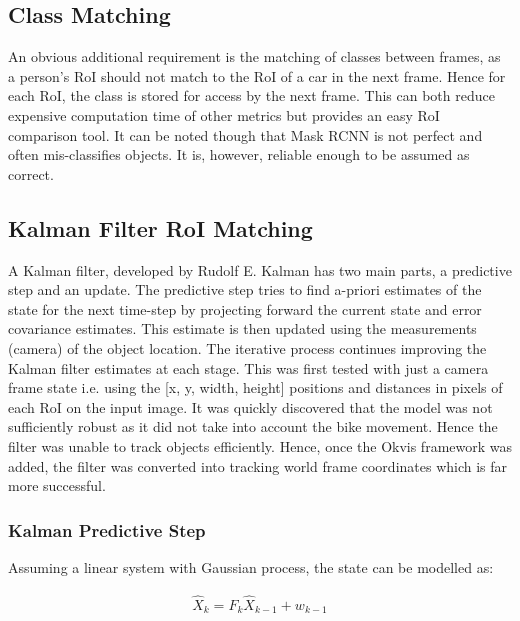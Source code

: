 \documentclass[11pt,twoside]{report}
\begin{document}
\subsection{Class Matching} \label{class_matching}
An obvious additional requirement is the matching of classes between frames, as a person's RoI should not match to the RoI of a car in the next frame. Hence for each RoI, the class is stored for access by the next frame. This can both reduce expensive computation time of other metrics but provides an easy RoI comparison tool. It can be noted though that Mask RCNN is not perfect and often mis-classifies objects. It is, however, reliable enough to be assumed as correct.

\subsection{Kalman Filter RoI Matching} \label{kalman_matching}

A Kalman filter, developed by Rudolf E. Kalman has two main parts, a predictive step and an update. The predictive step tries to find a-priori estimates of the state for the next time-step by projecting forward the current state and error covariance estimates. This estimate is then updated using the measurements (camera) of the object location. The iterative process continues improving the Kalman filter estimates at each stage. 
\newline \newline
This was first tested with just a camera frame state i.e. using the [x, y, width, height] positions and distances in pixels of each RoI on the input image. It was quickly discovered that the model was not sufficiently robust as it did not take into account the bike movement. Hence the filter was unable to track objects efficiently. Hence, once the Okvis framework was added, the filter was converted into tracking world frame coordinates which is far more successful.

\subsubsection{Kalman Predictive Step}
Assuming a linear system with Gaussian process, the state can be modelled as:

\begin{equation}
\begin{aligned}
\hat{X}_{k} =  F_{k} \hat{X}_{k-1} + w_{k-1}
\end{aligned}
\end{equation}
\end{document}
